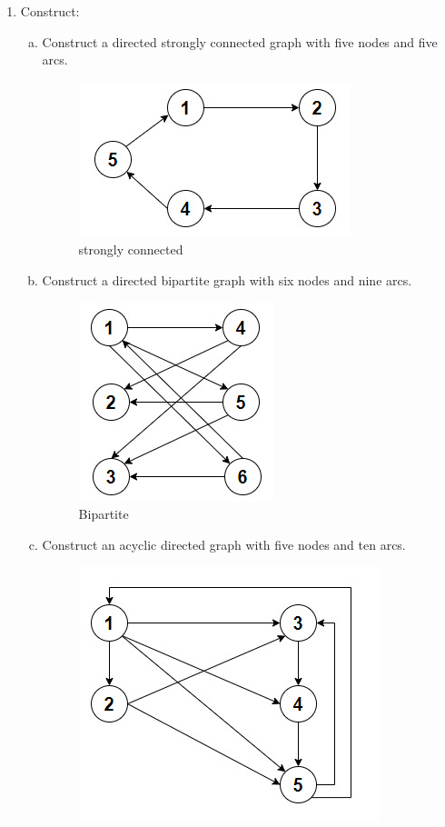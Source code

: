 \documentclass{report}
\begin{document}
\begin{enumerate}[2.1]
    \item  Construct:
    \begin{enumerate}[(a)]
        \item Construct a directed strongly connected graph with five nodes and five arcs.
        \begin{figure}[h!t]
            \centering
            \includegraphics[scale = 0.5]{2.5incisoa.jpeg}
            \caption{strongly connected}
        \end{figure}
        \item Construct a directed bipartite graph with six nodes and nine arcs.
        \begin{figure}[h!t]
            \centering
            \includegraphics[scale = 0.5]{2.5incisob.jpeg}
            \caption{Bipartite}
        \end{figure}
        \item Construct an acyclic directed graph with five nodes and ten arcs.
        \begin{figure}[h!t]
            \centering
            \includegraphics[scale = 0.5]{2.5incisoc.jpeg}            

\end{figure}
\end{enumerate}
\end{enumerate}
\end{document}
